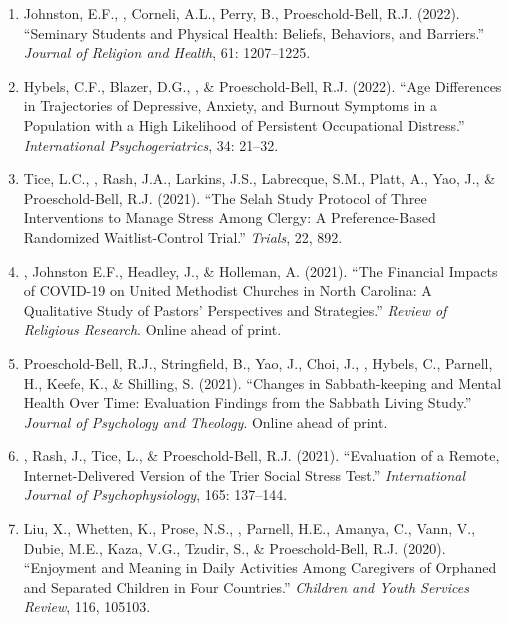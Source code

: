 \begin{enumerate}
\item Johnston, E.F., \Eagle, Corneli, A.L., Perry, B., Proeschold-Bell, R.J.  (2022). ``Seminary Students and Physical Health: Beliefs, Behaviors, and Barriers.'' \emph{Journal of Religion and Health}, 61: 1207--1225. 

\item Hybels, C.F., Blazer, D.G., \Eagle, \& Proeschold-Bell, R.J. (2022). ``Age Differences in Trajectories of Depressive, Anxiety, and Burnout Symptoms in a Population with a High Likelihood of Persistent Occupational Distress.'' \emph{International Psychogeriatrics}, 34: 21--32. 

\item Tice, L.C., \Eagle, Rash, J.A., Larkins, J.S., Labrecque, S.M., Platt, A., Yao, J., \& Proeschold-Bell, R.J. (2021). ``The Selah Study Protocol of Three Interventions to Manage Stress Among Clergy: A Preference-Based Randomized Waitlist-Control Trial.''  \emph{Trials}, 22, 892. 

\item \Eagle, Johnston E.F., Headley, J., \& Holleman, A. (2021). ``The Financial Impacts of COVID-19 on United Methodist Churches in North Carolina: A Qualitative Study of Pastors’ Perspectives and Strategies.'' \emph{Review of Religious Research}. Online ahead of print. 

\item Proeschold-Bell, R.J., Stringfield, B., Yao, J., Choi, J., \Eagle, Hybels, C., Parnell, H., Keefe, K., \& Shilling, S. (2021). ``Changes in Sabbath-keeping and Mental Health Over Time: Evaluation Findings from the Sabbath Living Study.'' \emph{Journal of Psychology and Theology}. Online ahead of print. 

\item \Eagle, Rash, J., Tice, L., \& Proeschold-Bell, R.J. (2021). ``Evaluation of a Remote, Internet-Delivered Version of the Trier Social Stress Test.'' \emph{International Journal of Psychophysiology}, 165: 137--144. 

\item Liu, X., Whetten, K., Prose, N.S., \Eagle, Parnell, H.E., Amanya, C., Vann, V., Dubie, M.E., Kaza, V.G., Tzudir, S., \& Proeschold-Bell, R.J. (2020). ``Enjoyment and Meaning in Daily Activities Among Caregivers of Orphaned and Separated Children in Four Countries.'' \emph{Children and Youth Services Review}, 116, 105103. 


\end{enumerate}
